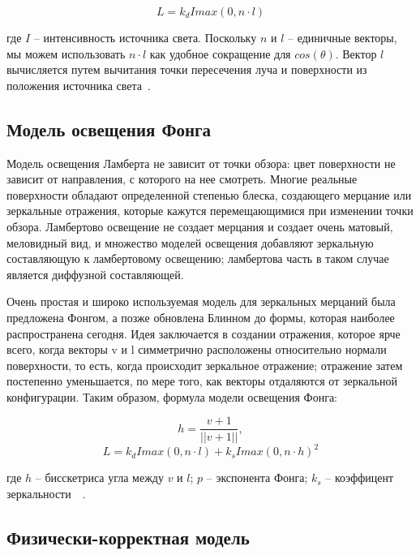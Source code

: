 \begin{equation}
L = k_d I max(0, n \cdot l)
\end{equation}

где $I$ -- интенсивность источника света. Поскольку $n$ и $l$ -- единичные векторы, мы можем использовать $n \cdot l$ как удобное сокращение для $cos(\theta)$. 
Вектор $l$ вычисляется путем вычитания точки пересечения луча и поверхности из положения 
источника света~\cite{FoCG}.

\subsection{Модель освещения Фонга}
Модель освещения Ламберта не зависит от точки обзора: цвет поверхности не 
зависит от направления, с которого на нее смотреть. Многие реальные поверхности 
обладают определенной степенью блеска, создающего мерцание или зеркальные отражения, 
которые кажутся перемещающимися при изменении точки обзора. 
Ламбертово освещение не создает мерцания и создает очень матовый, 
меловидный вид, и множество моделей освещения добавляют зеркальную 
составляющую к ламбертовому освещению; ламбертова часть в таком случае 
является диффузной составляющей. 

Очень простая и широко используемая модель для зеркальных мерцаний была 
предложена Фонгом, а позже обновлена Блинном до 
формы, которая наиболее распространена сегодня. Идея заключается в создании 
отражения, которое ярче всего, когда векторы v и l симметрично расположены 
относительно нормали поверхности, то есть, когда происходит зеркальное 
отражение; отражение затем постепенно уменьшается, по мере того, 
как векторы отдаляются от зеркальной конфигурации. Таким образом, формула модели
освещения Фонга:

\begin{equation}
    h = \frac{v + 1}{||v+1||},
\end{equation}
\begin{equation}
    L = k_d I max(0, n \cdot l) + k_s I max(0, n \cdot  h)^2
\end{equation}

где $h$ -- бисскетриса угла между $v$ и $l$; $p$ -- экспонента Фонга; $k_s$ -- коэффицент зеркальности~\cite{IFCGP}~\cite{FoCG}.

\subsection{Физически-корректная модель}

